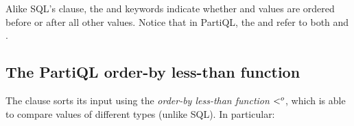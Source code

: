 Alike SQL's  clause, the  and 
keywords indicate whether \NULL and \MISSING values are ordered before
or after all other values. Notice that in PartiQL, the  and
 refer to both \NULL and \MISSING.


\subsection{The PartiQL order-by less-than function}
\label{sec:order-by-less-than}
The  clause sorts its input using the \textit{order-by less-than
function} $<^o$, which is able to compare values of different types (unlike
SQL). In particular:



